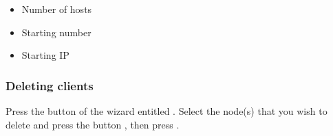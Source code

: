 \begin{itemize}
\item Number of hosts
\item Starting number
\item Starting IP
\end{itemize}



\subsubsection{Deleting clients}
\label{det:deleting-clients}

Press the button of the wizard entitled .
  Select the node(s) that you
wish to delete and press the button , then
press .


